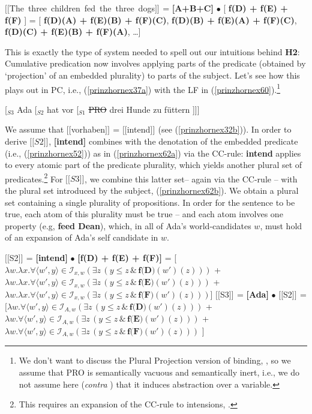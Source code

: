 \documentclass[output=paper,colorlinks,citecolor=brown,
]{langscibook}
\newcommand{\sem}[2]{\mbox{$[\![${#2}$]\!]^{#1}$}} %
\begin{document}
\ea \sem{}{The three children fed the three dogs} = \textbf{[A+B+C]} $\bullet$  [ \textbf{f(D) + f(E) + f(F)} ] =  [ \textbf{f(D)(A) + f(E)(B) + f(F)(C)}, \textbf{f(D)(B) + f(E)(A) + f(F)(C)},  \textbf{f(D)(C) + f(E)(B) + f(F)(A)}, \dots ]
\label{prinzhornex53}
\z

This is exactly the type of system needed to spell out our intuitions behind \textbf{H2}: Cumulative predication now involves applying parts of the predicate (obtained by `projection' of an embedded plurality) to parts of the subject. Let's see how this plays out in PC, i.e., (\ref{prinzhornex37a}) with the LF in (\ref{prinzhornex60}).\footnote{We don't want to discuss the  Plural Projection version of binding, \citep{Haslinger:2020d}, so we assume that PRO is semantically vacuous and semantically inert, i.e., we do not assume here (\textit{contra} \citealt{Heim:1998}) that it induces abstraction over a variable.} 

\ea  \label{prinzhornex60} [$_{S3}$ Ada [$_{S2}$ hat vor [$_{S1}$ \sout{PRO} drei Hunde zu f\"{u}ttern ]]]  \z

We assume that \sem{}{vorhaben} = \sem{}{intend} (see (\ref{prinzhornex32b})). In order to derive \sem{}{$S2$},  \textbf{[intend]} combines with the denotation of the embedded predicate (i.e., (\ref{prinzhornex52})) as in (\ref{prinzhornex62a}) via the CC-rule: \textbf{intend} applies to every atomic part of the predicate plurality, which yields another plural set of predicates.\footnote{This requires an expansion of the CC-rule to  intensions, \citep{Schmitt:2019a}.} For \sem{}{$S3$}, we combine this latter set-- again via the CC-rule -- with the plural set introduced by the subject, (\ref{prinzhornex62b}). We obtain a plural set containing a single plurality of propositions. In order for the sentence to be true, each atom of this plurality must be true -- and each atom involves one property (e.g, {\bf feed Dean}), which, in all of Ada's world-candidates $w$, must hold of an expansion of Ada's self candidate in $w$.




\ea
\ea  \sem{}{S2} = \textbf{[intend]} $\bullet$ \textbf{[f(D) + f(E) + f(F)]} = 
 [$\lambda w. \lambda x. \forall \langle w' ,y\rangle \in \mathcal{I}_{x,w} (\exists  z \,(y \le z\, \& \,\textbf{f(D)}(w')(z)))$ +
 $\lambda w. \lambda x. \forall \langle w' ,y\rangle \in \mathcal{I}_{x,w} (\exists  z \,(y \le z\, \& \,\textbf{f(E)}(w')(z)))$ +
 $\lambda w. \lambda x. \forall \langle w' ,y \rangle \in \mathcal{I}_{x,w} (\exists  z \,(y \le z\, \& \,\textbf{f(F)}(w')(z)))$]
\label{prinzhornex62a}
\ex \sem{}{S3} = \textbf{[Ada]} $\bullet$ \sem{}{S2} = \\
 $[\lambda w.  \forall \langle w' ,y \rangle \in \mathcal{I}_{A,w} (\exists  z \,(y \le z\, \& \,\textbf{f(D)}(w')(z)))$ +
 $\lambda w.  \forall \langle w' ,y\rangle \in \mathcal{I}_{A,w} (\exists  z \,(y \le z\, \& \,\textbf{f(E)}(w')(z)))$ +
 $\lambda w.  \forall \langle w' ,y \rangle \in \mathcal{I}_{A,w} (\exists  z \,(y \le z\, \& \,\textbf{f(F)}(w')(z)))$ ]
\label{prinzhornex62b}
\z\z
\end{document}
